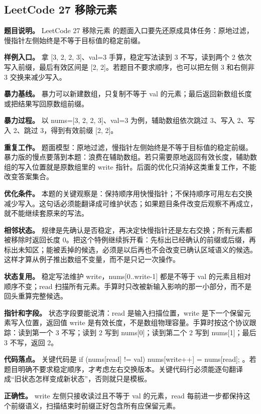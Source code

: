 \subsection{LeetCode 27 移除元素}

\textbf{题目说明。} LeetCode 27 移除元素 的题面入口要先还原成具体任务：原地过滤，慢指针左侧始终是不等于目标值的稳定前缀。

\textbf{样例入口。} 拿 [3, 2, 2, 3]、val=3 手算，稳定写法读到 3 不写，读到两个 2 依次写入前缀，最后有效区间是 [2, 2]。若题目不要求顺序，也可以把左侧 3 和右侧非 3 交换来减少写入。

\textbf{暴力基线。} 暴力可以新建数组，只复制不等于 val 的元素；最后返回新数组长度或把结果写回原数组前缀。

\textbf{暴力过程。} 以 nums=[3, 2, 2, 3]、val=3 为例，辅助数组依次跳过 3、写入 2、写入 2、跳过 3，得到有效前缀 [2, 2]。

\textbf{重复工作。} 题面模型：原地过滤，慢指针左侧始终是不等于目标值的稳定前缀。暴力版的慢点要落到本题：浪费在辅助数组。若只需要原地返回有效长度，辅助数组的写入位置就是原数组里的 write 指针。后面的优化只消掉这类重复工作，不能改变答案集合。

\textbf{优化条件。} 本题的关键观察是：保持顺序用快慢指针；不保持顺序可用左右交换减少写入。这句话必须能翻译成可维护状态；如果题目条件改变后观察不再成立，就不能继续套原来的写法。

\textbf{相邻状态。} 规律是先确认是否稳定，再决定快慢指针还是左右交换；所有元素都被移除时返回长度 0。把这个特例继续拆开看：先标出已经确认的前缀或后缀，再标出未知区；能被丢掉的候选，必须是以后再也不会改变已确认区域语义的候选。这样才算从例子推出数组不变量，而不是只记一次操作。

\textbf{状态复用。} 稳定写法维护 write，nums[0..write-1] 都是不等于 val 的元素且相对顺序不变；read 扫描所有元素。手算时只改被新输入影响的那一小部分，而不是回头重算完整候选。

\textbf{指针和字段。} 状态字段要能说清：read 是输入扫描位置，write 是下一个保留元素写入位置，返回值 write 是有效长度，不是数组物理容量。手算时按这个协议跟踪：读到第一个 3 不写；读到 2 写到 nums[0]；读到第二个 2 写到 nums[1]；最后 3 不写，返回 2。

\textbf{代码落点。} 关键代码是 if (nums[read] != val) nums[write++] = nums[read]; 。若题目明确不要求稳定顺序，才考虑左右交换版本。关键代码行必须能逐句翻译成“旧状态怎样变成新状态”，否则就只是模板。

\textbf{正确性。} write 左侧只接收读过且不等于 val 的元素，read 每前进一步都保持这个前缀语义，扫描结束时前缀正好包含所有应保留元素。

